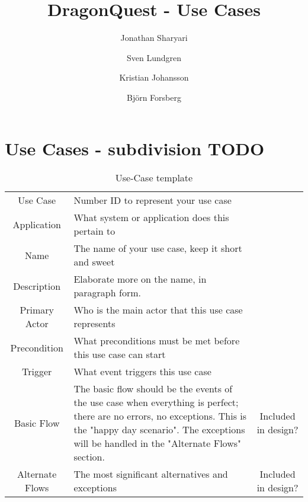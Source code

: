 \documentclass[a4paper,10pt]{report}
\title{\textbf{DragonQuest - Use Cases}}
\author{Jonathan Sharyari \and Sven Lundgren \and Kristian Johansson \and Bj{\"o}rn Forsberg}
\begin{document}
\maketitle



\section*{Use Cases - subdivision TODO}

\begin{table}[h!]
\label{template}
\caption{Use-Case template}
\begin{tabular}{|c| p{9cm}|c}
\hline
Use Case & Number ID to represent your use case & \\
Application & What system or application does this pertain to & \\
Name & The name of your use case, keep it short and sweet &  \\
Description	& Elaborate more on the name, in paragraph form. & \\
Primary Actor & Who is the main actor that this use case represents & \\
Precondition &	What preconditions must be met before this use case can start & \\
Trigger	& What event triggers this use case & \\ \hline
Basic Flow	& The basic flow should be the events of the use case when everything is perfect; there are no errors, no exceptions. This is the "happy day scenario". The exceptions will be handled in the "Alternate Flows" section. & Included in design? \\ \hline
Alternate Flows	& The most significant alternatives and exceptions & Included in design? \\
\hline
\end{tabular}
\end{table}
\end{document}
